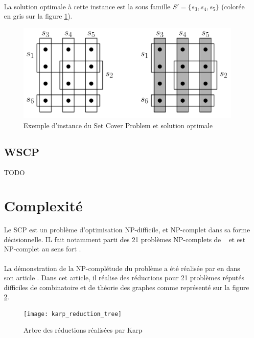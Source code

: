 \documentclass[12pt,letterpaper,twoside]{article}
\begin{document}
			\paragraph*{}
				La solution optimale à cette instance est la sous famille \(S'=\{s_3, s_4, s_5\}\) (colorée en gris sur la figure \ref{fig:example}).
			\begin{figure}[H]
				\centering%
				\includegraphics[width=0.65\linewidth]{figures/example}%
				\caption{Exemple d'instance du Set Cover Problem et solution optimale\cite{Mount2017}}%
				\label{fig:example}%
			\end{figure}
		\subsection{WSCP}
			TODO
	\section{Complexité}
		\paragraph*{}
			Le SCP est un problème d'optimisation NP-difficile, et NP-complet dans sa forme décisionnelle. IL fait notamment parti des 21 problèmes NP-complets de \citeauthor{Karp1972}~\cite{Karp1972} et est NP-complet au sens fort \cite{garey2002computers}.
		\paragraph*{}
			La démonstration de la NP-complétude du problème a été réalisée par \citeauthor{Karp1972} en \citeyear{Karp1972} dans son article \cite{Karp1972}. Dans cet article, il réalise des réductions pour 21 problèmes réputés difficiles de combinatoire et de théorie des graphes comme représenté sur la figure \ref{fig:karp_reduction_tree}.
		\begin{figure}[H]
			\centering%
			\texttt{[image: karp\_reduction\_tree]}%
			\caption{Arbre des réductions réalisées par Karp\cite{Karp1972}}%
			\label{fig:karp_reduction_tree}%
		\end{figure}
\end{document}
